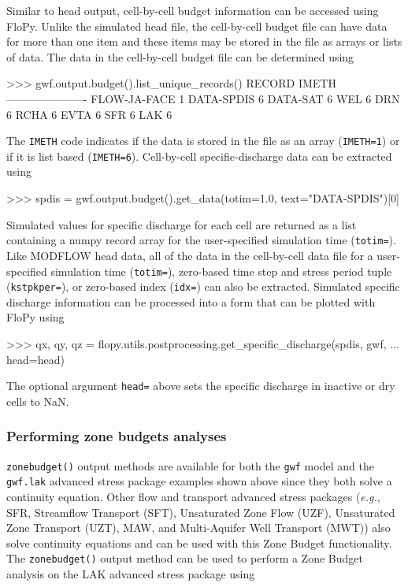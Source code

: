 \documentclass[12pt, oneside]{article}  	%
\begin{document}
Similar to head output, cell-by-cell budget information can be accessed using FloPy. Unlike the simulated head file, the cell-by-cell budget file can have data for more than one item and these items may be stored in the file as arrays or lists of data. The data in the cell-by-cell budget file can be determined using

\begin{python}
>>> gwf.output.budget().list_unique_records()
RECORD           IMETH
----------------------
FLOW-JA-FACE         1
DATA-SPDIS           6
DATA-SAT             6
WEL                  6
DRN                  6
RCHA                 6
EVTA                 6
SFR                  6
LAK                  6
\end{python}

\noindent The \texttt{IMETH} code indicates if the data is stored in the file as an array (\texttt{IMETH=1}) or if it is list based (\texttt{IMETH=6}). Cell-by-cell specific-discharge data can be extracted using

\begin{python}
>>> spdis = gwf.output.budget().get_data(totim=1.0, text="DATA-SPDIS")[0]
\end{python}

\noindent Simulated values for specific discharge for each cell are returned as a list containing a numpy record array for the user-specified simulation time (\texttt{totim=}). Like MODFLOW head data, all of the data in the cell-by-cell data file for a user-specified simulation time (\texttt{totim=}), zero-based time step and stress period tuple (\texttt{kstpkper=}), or zero-based index (\texttt{idx=}) can also be extracted. Simulated specific discharge information can be processed into a form that can be plotted with FloPy using 

\begin{python}
>>> qx, qy, qz = flopy.utils.postprocessing.get_specific_discharge(spdis, gwf, 
... head=head)
\end{python}

\noindent The optional argument \texttt{head=} above sets the specific discharge in inactive or dry cells to NaN. 

\subsubsection*{Performing zone budgets analyses}

\texttt{zonebudget()} output methods are available for both the \texttt{gwf} model and the \texttt{gwf.lak} advanced stress package examples shown above since they both solve a continuity equation. Other flow and transport advanced stress packages (\textit{e.g.}, SFR, Streamflow Transport (SFT), Unsaturated Zone Flow (UZF), Unsaturated Zone Transport (UZT), MAW, and Multi-Aquifer Well Transport (MWT)) also solve continuity equations and can be used with this Zone Budget functionality. The \texttt{zonebudget()} output method can be used to perform a Zone Budget analysis on the LAK advanced stress package using
\end{document}
